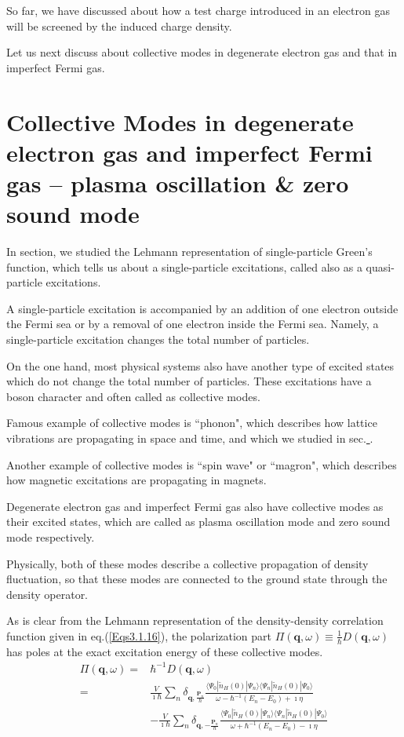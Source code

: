 So far, we have discussed about how a test charge introduced in an electron gas will be screened by the induced charge density.

Let us next discuss about collective modes in degenerate electron gas and that in imperfect Fermi gas.

\section{Collective Modes in degenerate electron gas and imperfect Fermi gas -- plasma oscillation \& zero sound mode}

In section, we studied the Lehmann representation of single-particle Green's function, which tells us about a single-particle excitations, called also as a quasi-particle excitations.

A single-particle excitation is accompanied by an addition of one electron outside the Fermi sea or by a removal of one electron inside the Fermi sea. Namely, a single-particle excitation changes the total number of particles.

On the one hand, most physical systems also have another type of excited states which do not change the total number of particles. These excitations have a boson character and often called as collective modes.

Famous example of collective modes is ``phonon", which describes how lattice vibrations are propagating in space and time, and which we studied in sec.\underline{    }.

Another example of collective modes is ``spin wave" or ``magron", which describes how magnetic excitations are propagating in magnets.

Degenerate electron gas and imperfect Fermi gas also have collective modes as their excited states, which are called as plasma oscillation mode and zero sound mode respectively.

Physically, both of these modes describe a collective propagation of density fluctuation, so that these modes are connected to the ground state through the density operator.

As is clear from the Lehmann representation of the density-density correlation function given in eq.(\ref{Eqs3.1.16}), the polarization part $\Pi(\mathbf{q},\omega) \equiv \frac{1}{\hbar}D(\mathbf{q},\omega)$ has poles at the exact excitation energy of these collective modes.
\begin{equation*} \tag{3.1.16'} \begin{split}
\Pi(\mathbf{q},\omega)=& \hbar^{-1} D(\mathbf{q},\omega)\\
=& \frac{V}{\imath \hbar} \sum_n \delta_{\mathbf{q},\frac{\mathbf{P}_n}{\hbar}}\frac{\langle \Psi_0 | \tilde{n}_H(0) | \Psi_n \rangle \langle \Psi_n | \tilde{n}_H(0) | \Psi_0 \rangle}{ \omega - \hbar^{-1}(E_n-E_0) + \imath \eta}\\
& -\frac{V}{\imath \hbar} \sum_n \delta_{\mathbf{q},-\frac{\mathbf{P}_n}{\hbar}}\frac{\langle \Psi_0 | \tilde{n}_H(0) | \Psi_n \rangle \langle \Psi_n | \tilde{n}_H(0) | \Psi_0 \rangle}{ \omega + \hbar^{-1}(E_n-E_0) - \imath \eta}
\end{split} \end{equation*}

